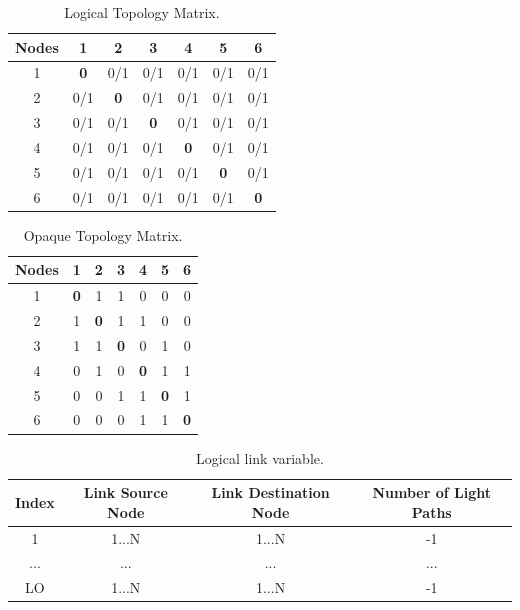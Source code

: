 \begin{table}[H]
	\centering	
	\begin{tabular}{|c|c|c|c|c|c|c|}
		\hline
		\multicolumn{1}{|l|}{Nodes} & 1   & 2   & 3   & 4   & 5   & 6   \\ \hline
		1                           & \textbf{0}   & 0/1 & 0/1 & 0/1 & 0/1 & 0/1 \\ \hline
		2                           & 0/1 & \textbf{0}   & 0/1 & 0/1 & 0/1 & 0/1 \\ \hline
		3                           & 0/1 & 0/1 & \textbf{0}   & 0/1 & 0/1 & 0/1 \\ \hline
		4                           & 0/1 & 0/1 & 0/1 & \textbf{0}   & 0/1 & 0/1 \\ \hline
		5                           & 0/1 & 0/1 & 0/1 & 0/1 & \textbf{0}   & 0/1 \\ \hline
		6                           & 0/1 & 0/1 & 0/1 & 0/1 & 0/1 & \textbf{0}   \\ \hline
	\end{tabular}
	\caption{Logical Topology Matrix.}
	\label{logical_topology}
\end{table}
\begin{table}[H]
	\centering	
	\begin{tabular}{|c|c|c|c|c|c|c|}
		\hline
		\multicolumn{1}{|l|}{Nodes} & 1   & 2   & 3   & 4   & 5   & 6  \\ \hline
		1                           & \textbf{0}   & 1 & 1 & 0 & 0 & 0 \\ \hline
		2                           & 1 & \textbf{0}   & 1 & 1 & 0 & 0 \\ \hline
		3                           & 1 & 1 & \textbf{0}   & 0 & 1 & 0 \\ \hline
		4                           & 0 & 1 & 0 & \textbf{0}   & 1 & 1 \\ \hline
		5                           & 0 & 0 & 1 & 1 & \textbf{0}   & 1 \\ \hline
		6                           & 0 & 0 & 0 & 1 & 1 & \textbf{0}   \\ \hline
	\end{tabular}
	\caption{Opaque Topology Matrix.}
	\label{Opaque_logical_topology}
\end{table}

\begin{table}[H]
	\centering
	\begin{tabular}{|c|c|c|c|}
		\hline
		Index & Link Source Node & Link Destination Node & Number of Light Paths \\ \hline
		1     & 1...N            & 1...N                 & -1                 \\ \hline
		...   & ...              & ...                   & ...                   \\ \hline
		LO    & 1...N            & 1...N                 & -1                 \\ \hline
	\end{tabular}
	\caption{Logical link variable.}
	\label{logicalLink_variable}
\end{table}

